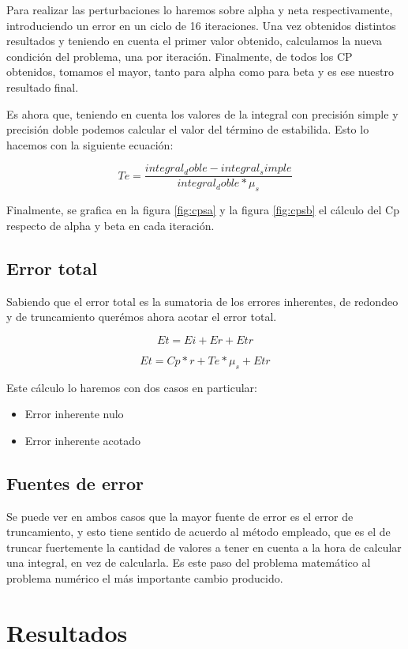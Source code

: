 \documentclass[11pt,a4paper]{article}
\begin{document}
Para realizar las perturbaciones lo haremos sobre alpha y neta respectivamente, introduciendo un error en un ciclo de 16 iteraciones. Una vez obtenidos distintos resultados y teniendo en cuenta el primer valor obtenido, calculamos la nueva condición del problema, una por iteración. Finalmente, de todos los CP obtenidos, tomamos el mayor, tanto para alpha como para beta y es ese nuestro resultado final.

Es ahora que, teniendo en cuenta los valores de la integral con precisión simple y precisión doble podemos calcular el valor del término de estabilida. Esto lo hacemos con la siguiente ecuación:

\[ Te = \frac{integral_doble - integral_simple}{integral_doble*\mu_s} \]

Finalmente, se grafica en la figura \ref{fig:cpsa} y la figura \ref{fig:cpsb} el cálculo del Cp respecto de alpha y beta en cada iteración.


\subsection{Error total}

Sabiendo que el error total es la sumatoria de los errores inherentes, de redondeo y de truncamiento querémos ahora acotar el error total.

\[ Et = Ei + Er + Etr \]

\[ Et = Cp * r + Te * \mu_s + Etr \]

Este cálculo lo haremos con dos casos en particular:

\begin{itemize}
\item Error inherente nulo
\item Error inherente acotado
\end{itemize}

\subsection{Fuentes de error}

Se puede ver en ambos casos que la mayor fuente de error es el error de truncamiento, y esto tiene sentido de acuerdo al método empleado, que es el de truncar fuertemente la cantidad de valores a tener en cuenta a la hora de calcular una integral, en vez de calcularla. Es este paso del problema matemático al problema numérico el más importante cambio producido.

\section{Resultados}
\end{document}
